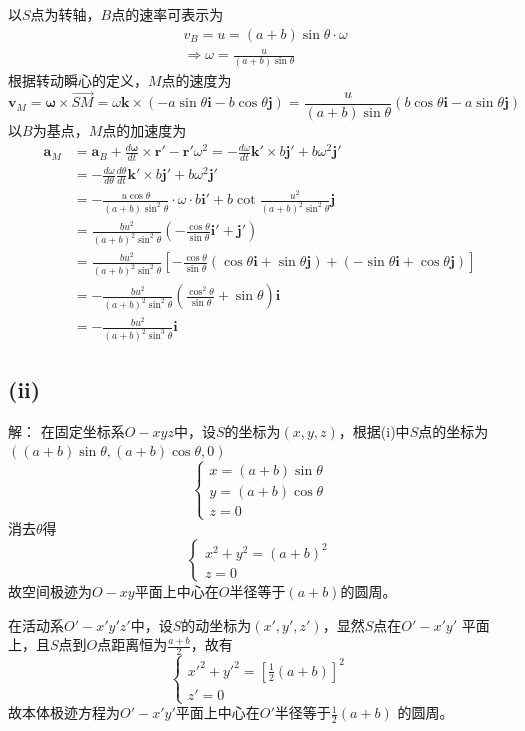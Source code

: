\documentclass[10pt,a4paper]{article}
\theoremstyle{remark}
\begin{document}
以$S$点为转轴，$B$点的速率可表示为
\begin{align*}
&v_B = u = (a + b)\sin\theta\cdot\omega\\
&\Longrightarrow\omega = \frac{u}{(a + b)\sin\theta}
\end{align*}
根据转动瞬心的定义，$M$点的速度为
\[
\bm{v}_M = \bm{\omega}\times\overrightarrow{SM} = \omega\bm{k}\times(-a\sin\theta\bm{i}-b\cos\theta\bm{j}) = \frac{u}{(a + b)\sin\theta}(b\cos\theta\bm{i} - a\sin\theta\bm{j})
\]
以$B$为基点，$M$点的加速度为
\begin{align*}
\bm{a}_M &= \bm{a}_B + \frac{d\bm{\omega}}{dt}\times \bm{r}' - \bm{r}'\omega^2 = -\frac{d\omega}{dt}\bm{k}'\times b\bm{j}' + b\omega^2\bm{j}'\\
&= -\frac{d\omega}{d\theta}\frac{d\theta}{dt}\bm{k}'\times b\bm{j}' + b\omega^2\bm{j}'\\
&= -\frac{u\cos\theta}{(a + b)\sin^2\theta}\cdot\omega\cdot b\bm{i}' + b\cot\frac{u^2}{(a + b)^2\sin^2\theta}\bm{j}\\
&= \frac{bu^2}{(a + b)^2\sin^2\theta}(-\frac{\cos\theta}{\sin\theta}\bm{i}' + \bm{j}')\\
&= \frac{bu^2}{(a + b)^2\sin^2\theta}[-\frac{\cos\theta}{\sin\theta}(\cos\theta\bm{i} + \sin\theta\bm{j}) + (-\sin\theta\bm{i} + \cos\theta\bm{j})]\\
&= -\frac{bu^2}{(a + b)^2\sin^2\theta}(\frac{\cos^2\theta}{\sin\theta} + \sin\theta)\bm{i}\\
&= -\frac{bu^2}{(a + b)^2\sin^3\theta}\bm{i}
\end{align*}
\subsection*{(ii)}解：
在固定坐标系$O-xyz$中，设$S$的坐标为$(x,y,z)$，根据(i)中$S$点的坐标为$((a + b)\sin\theta,(a + b)\cos\theta,0)$
\[
\left\{\begin{array}{l}
x = (a + b)\sin\theta\\
y = (a + b)\cos\theta\\
z = 0
\end{array}\right.
\]
消去$\theta$得
\[
\left\{\begin{array}{l}
x^2 + y^2 = (a + b)^2\\
z = 0
\end{array}\right.
\]
故空间极迹为$O-xy$平面上中心在$O$半径等于$(a + b)$的圆周。

在活动系$O'-x'y'z'$中，设$S$的动坐标为$(x',y',z')$，显然$S$点在$O'-x'y'$ 平面上，且$S$点到$O$点距离恒为$\frac{a + b}{2}$，故有
\[
\left\{\begin{array}{l}
x'^2 + y'^2 = [\frac{1}{2}(a + b)]^2\\
z' = 0
\end{array}\right.
\]
故本体极迹方程为$O'-x'y'$平面上中心在$O'$半径等于$\frac{1}{2}(a + b)$ 的圆周。
\end{document}
